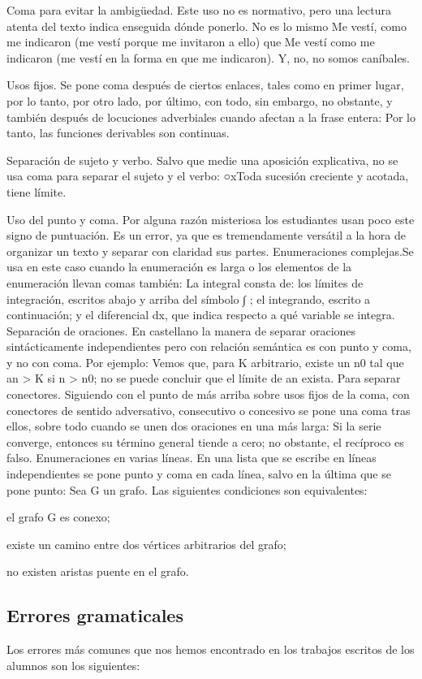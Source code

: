 Coma para evitar la ambigüedad. Este uso no es normativo, pero una lectura atenta del texto indica enseguida dónde ponerlo. No es lo mismo Me vestí, como me indicaron (me vestí porque me invitaron a ello) que Me vestí como me indicaron (me vestí en la forma en que me indicaron). Y, no, no somos caníbales.

Usos fijos. Se pone coma después de ciertos enlaces, tales como en primer lugar, por lo tanto, por otro lado, por último, con todo, sin embargo, no obstante, y también después de locuciones adverbiales cuando afectan a la frase entera: Por lo tanto, las funciones derivables son continuas.

Separación de sujeto y verbo. Salvo que medie una aposición explicativa, no se usa coma para separar el sujeto y el verbo: ○xToda sucesión creciente y acotada, tiene límite.


Uso del punto y coma. Por alguna razón misteriosa los estudiantes usan poco este signo de puntuación. Es un error, ya que es tremendamente versátil a la hora de organizar un texto y separar con claridad sus partes.
Enumeraciones complejas.Se usa en este caso cuando la enumeración es larga o los elementos de la enumeración llevan comas también: La integral consta de: los límites de integración, escritos abajo y arriba del símbolo ∫ ; el integrando, escrito a continuación; y el diferencial dx, que indica respecto a qué variable se integra.
Separación de oraciones. En castellano la manera de separar oraciones sintácticamente independientes pero con relación semántica es con punto y coma, y no con coma. Por ejemplo: Vemos que, para K arbitrario, existe un n0 tal que an > K si n > n0; no se puede concluir que el límite de an exista.
Para separar conectores. Siguiendo con el punto de más arriba sobre usos fijos de la coma, con conectores de sentido adversativo, consecutivo o concesivo se pone una coma tras ellos, sobre todo cuando se unen dos oraciones en una más larga: Si la serie converge, entonces su término general tiende a cero; no obstante, el recíproco es falso.
Enumeraciones en varias líneas. En una lista que se escribe en líneas independientes se pone punto y coma en cada línea, salvo en la última que se pone punto:
Sea G un grafo. Las siguientes condiciones son equivalentes:

el grafo G es conexo;

existe un camino entre dos vértices arbitrarios del grafo;

no existen aristas puente en el grafo.


\subsection{Errores gramaticales}
Los errores más comunes que nos hemos encontrado en los trabajos escritos de los alumnos son los siguientes:

